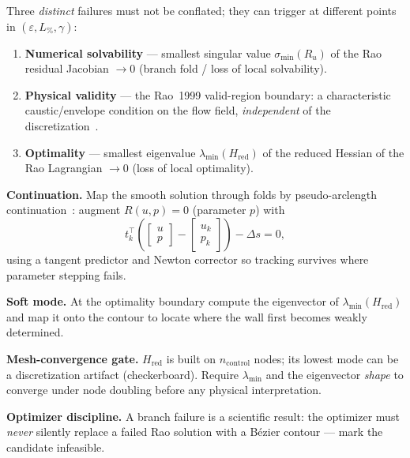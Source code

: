 \documentclass[11pt]{article}
\begin{document}
Three \emph{distinct} failures must not be conflated; they can trigger at
different points in $(\varepsilon,L_\%,\gamma)$:
\begin{enumerate}[leftmargin=1.6em,itemsep=2pt]
\item \textbf{Numerical solvability} --- smallest singular value
$\sigma_{\min}(R_u)$ of the Rao residual Jacobian $\to 0$ (branch fold / loss of
local solvability).
\item \textbf{Physical validity} --- the Rao~1999 valid-region boundary: a
characteristic caustic/envelope condition on the flow field, \emph{independent}
of the discretization~\cite{rao1999}.
\item \textbf{Optimality} --- smallest eigenvalue $\lambda_{\min}(H_\mathrm{red})$
of the reduced Hessian of the Rao Lagrangian $\to 0$ (loss of local optimality).
\end{enumerate}

\textbf{Continuation.} Map the smooth solution through folds by pseudo-arclength
continuation~\cite{keller1977}: augment $R(u,p)=0$ (parameter $p$) with
\begin{equation}
t_k^{\!\top}\!\left(\begin{bmatrix}u\\p\end{bmatrix}
-\begin{bmatrix}u_k\\p_k\end{bmatrix}\right)-\Delta s=0,
\end{equation}
using a tangent predictor and Newton corrector so tracking survives where
parameter stepping fails.

\textbf{Soft mode.} At the optimality boundary compute the eigenvector of
$\lambda_{\min}(H_\mathrm{red})$ and map it onto the contour to locate where the
wall first becomes weakly determined.
\begin{warnbox}
\textbf{Mesh-convergence gate.} $H_\mathrm{red}$ is built on $n_\mathrm{control}$
nodes; its lowest mode can be a discretization artifact (checkerboard). Require
$\lambda_{\min}$ and the eigenvector \emph{shape} to converge under node
doubling before any physical interpretation.
\end{warnbox}
\textbf{Optimizer discipline.} A branch failure is a scientific result: the
optimizer must \emph{never} silently replace a failed Rao solution with a
B\'ezier contour --- mark the candidate infeasible.

\end{document}
